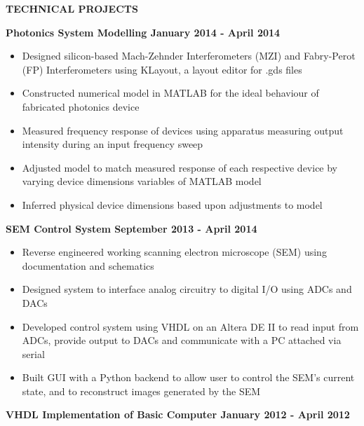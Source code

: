 \documentclass[letterpaper]{article}\usepackage[margin=0.5in]{geometry}
\begin{document}
\vspace{10 mm}
\Large{\textbf{TECHNICAL PROJECTS}}
\normalsize

\vspace{5 mm}
\textbf{Photonics System Modelling \hfill January 2014 - April 2014}

\begin{itemize}
\itemsep0em
	\item
	Designed silicon-based Mach-Zehnder Interferometers (MZI) and Fabry-Perot (FP) Interferometers using KLayout, a layout editor for .gds files
	\item
	Constructed numerical model in MATLAB for the ideal behaviour of fabricated photonics device
	\item
	Measured frequency response of devices using apparatus measuring output intensity during an input frequency sweep
	\item
	Adjusted model to match measured response of each respective device by varying device dimensions variables of MATLAB model
	\item
	Inferred physical device dimensions based upon adjustments to model
\end{itemize}	

\vspace{5 mm}
\textbf{SEM Control System \hfill September 2013 - April 2014}

\begin{itemize}
\itemsep0em
	\item
	Reverse engineered working scanning electron microscope (SEM) using documentation and schematics
	\item
	Designed system to interface analog circuitry to digital I/O using ADCs and DACs
	\item
	Developed control system using VHDL on an Altera DE II to read input from ADCs, provide output to DACs and communicate with a PC attached via serial
	\item
	Built GUI with a Python backend to allow user to control the SEM's current state, and to reconstruct images generated by the SEM
\end{itemize}

\vspace{5 mm}
\textbf{VHDL Implementation of Basic Computer \hfill January 2012 - April 2012}	
\end{document}
